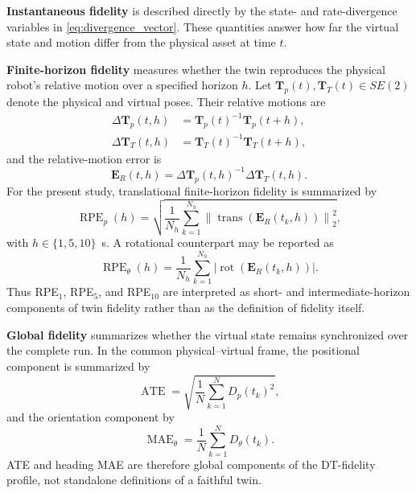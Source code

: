 \documentclass[conference]{IEEEtran}
\newcommand{\Dp}{D_{p}}
\newcommand{\Dtheta}{D_{\theta}}
\begin{document}
\textbf{Instantaneous fidelity} is described directly by the state- and rate-divergence variables in \eqref{eq:divergence_vector}. These quantities answer how far the virtual state and motion differ from the physical asset at time $t$.

\textbf{Finite-horizon fidelity} measures whether the twin reproduces the physical robot's relative motion over a specified horizon $h$. Let $\mathbf{T}_{p}(t),\mathbf{T}_{T}(t)\in SE(2)$ denote the physical and virtual poses. Their relative motions are
\begin{align}
\Delta\mathbf{T}_{p}(t,h) &= \mathbf{T}_{p}(t)^{-1}\mathbf{T}_{p}(t+h),\\
\Delta\mathbf{T}_{T}(t,h) &= \mathbf{T}_{T}(t)^{-1}\mathbf{T}_{T}(t+h),
\end{align}
and the relative-motion error is
\begin{equation}
\mathbf{E}_{R}(t,h)=\Delta\mathbf{T}_{p}(t,h)^{-1}\Delta\mathbf{T}_{T}(t,h).
\end{equation}
For the present study, translational finite-horizon fidelity is summarized by
\begin{equation}
\operatorname{RPE}_{p}(h)=
\sqrt{\frac{1}{N_h}\sum_{k=1}^{N_h}
\left\|\operatorname{trans}\!\left(\mathbf{E}_{R}(t_k,h)\right)\right\|_2^2},
\label{eq:rpe}
\end{equation}
with $h\in\{1,5,10\}$~s. A rotational counterpart may be reported as
\begin{equation}
\operatorname{RPE}_{\theta}(h)=
\frac{1}{N_h}\sum_{k=1}^{N_h}
\left|\operatorname{rot}\!\left(\mathbf{E}_{R}(t_k,h)\right)\right|.
\end{equation}
Thus RPE$_1$, RPE$_5$, and RPE$_{10}$ are interpreted as short- and intermediate-horizon components of twin fidelity rather than as the definition of fidelity itself.

\textbf{Global fidelity} summarizes whether the virtual state remains synchronized over the complete run. In the common physical--virtual frame, the positional component is summarized by
\begin{equation}
\operatorname{ATE}=
\sqrt{\frac{1}{N}\sum_{k=1}^{N}\Dp(t_k)^2},
\label{eq:ate}
\end{equation}
and the orientation component by
\begin{equation}
\operatorname{MAE}_{\theta}=
\frac{1}{N}\sum_{k=1}^{N}\Dtheta(t_k).
\label{eq:heading_mae}
\end{equation}
ATE and heading MAE are therefore global components of the DT-fidelity profile, not standalone definitions of a faithful twin.
\end{document}
